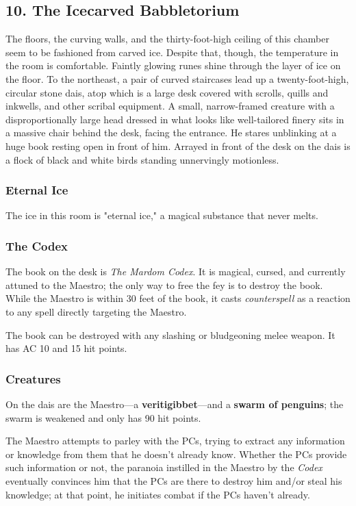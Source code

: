 \documentclass[10pt,a4paper,twoside,bg=print,twocolumn,openany,nodeprecatedcode]{dndbook}
\begin{document}
\subsection{10. The Icecarved Babbletorium}
\begin{DndReadAloud}{}
The floors, the curving walls, and the thirty-foot-high ceiling of this chamber seem to be fashioned from carved ice. Despite that, though, the temperature in the room is comfortable. Faintly glowing runes shine through the layer of ice on the floor. To the northeast, a pair of curved staircases lead up a twenty-foot-high, circular stone dais, atop which is a large desk covered with scrolls, quills and inkwells, and other scribal equipment. A small, narrow-framed creature with a disproportionally large head dressed in what looks like well-tailored finery sits in a massive chair behind the desk, facing the entrance. He stares unblinking at a huge book resting open in front of him. Arrayed in front of the desk on the dais is a flock of black and white birds standing unnervingly motionless.

\end{DndReadAloud}

\subsubsection{Eternal Ice}
The ice in this room is "eternal ice," a magical substance that never melts.

\subsubsection{The Codex}
The book on the desk is \textit{The Mardom Codex}. It is magical, cursed, and currently attuned to the Maestro; the only way to free the fey is to destroy the book. While the Maestro is within 30 feet of the book, it casts \textit{counterspell} as a reaction to any spell directly targeting the Maestro.

The book can be destroyed with any slashing or bludgeoning melee weapon. It has AC 10 and 15 hit points.

\subsubsection{Creatures}
On the dais are the Maestro—a \textbf{veritigibbet}—and a \textbf{swarm of penguins}; the swarm is weakened and only has 90 hit points.

The Maestro attempts to parley with the PCs, trying to extract any information or knowledge from them that he doesn't already know. Whether the PCs provide such information or not, the paranoia instilled in the Maestro by the \textit{Codex} eventually convinces him that the PCs are there to destroy him and/or steal his knowledge; at that point, he initiates combat if the PCs haven't already.
\end{document}
